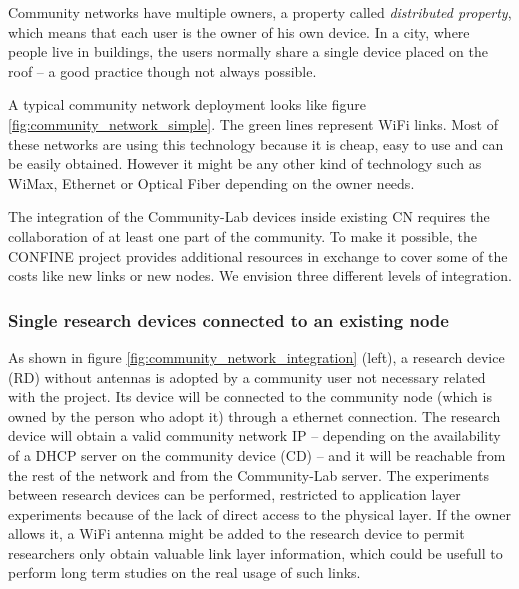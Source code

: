 \documentclass[conference]{IEEEtran}
\begin{document}
Community networks have multiple owners, a property called \textit{distributed property}, 
which means that each user is the owner of his own device. In a city, where people live in 
buildings, the users normally share a single device placed on the roof -- a good practice though
not always possible.

A typical community network deployment looks like figure \ref{fig:community_network_simple}.
The green lines represent WiFi links. Most of these networks are using this technology because 
it is cheap, easy to use and can be easily obtained. However it might be any other kind of technology 
such as WiMax, Ethernet or Optical Fiber depending on the owner needs.


The integration of the Community-Lab devices inside existing CN requires the collaboration of at least
one part of the community. To make it possible, the CONFINE project provides additional resources in exchange
to cover some of the costs like new links or new nodes. We envision three different levels of integration.

\subsubsection{Single research devices connected to an existing node}
\label{sec:single-research-devices}

As shown in figure \ref{fig:community_network_integration} (left), a research device (RD) without antennas is 
adopted by a community user not necessary related with the project.
Its device will be connected to the community node (which is owned by the person who adopt it) through a ethernet connection. 
The research device will obtain a valid community network IP -- depending on the availability of a DHCP server on the community device (CD) --
and it will be reachable from the rest of the network and from the Community-Lab server.
The experiments between research devices can be performed, restricted to application layer experiments because of the 
lack of direct access to the physical layer. If the owner allows it, a WiFi antenna might be 
added to the research device to permit researchers only obtain valuable link layer information, which could
be usefull to perform long term studies on the real usage of such links.
\end{document}
